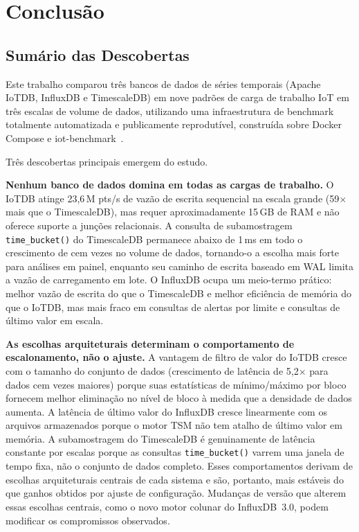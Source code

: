 \section{Conclusão}
\label{sec:conclusion}

\subsection{Sumário das Descobertas}

Este trabalho comparou três bancos de dados de séries temporais (Apache IoTDB, InfluxDB e
TimescaleDB) em nove padrões de carga de trabalho IoT em três escalas de volume de dados,
utilizando uma infraestrutura de benchmark totalmente automatizada e publicamente reprodutível,
construída sobre Docker Compose e iot-benchmark~\cite{iotbenchmark}.

Três descobertas principais emergem do estudo.

\textbf{Nenhum banco de dados domina em todas as cargas de trabalho.} O IoTDB atinge
23,6\,M pts/s de vazão de escrita sequencial na escala grande (59$\times$ mais que o
TimescaleDB), mas requer aproximadamente 15\,GB de RAM e não oferece suporte a junções
relacionais. A consulta de subamostragem \texttt{time\_bucket()} do TimescaleDB permanece
abaixo de 1\,ms em todo o crescimento de cem vezes no volume de dados, tornando-o a escolha mais
forte para análises em painel, enquanto seu caminho de escrita baseado em WAL limita a vazão
de carregamento em lote. O InfluxDB ocupa um meio-termo prático: melhor vazão de escrita do
que o TimescaleDB e melhor eficiência de memória do que o IoTDB, mas mais fraco em consultas
de alertas por limite e consultas de último valor em escala.

\textbf{As escolhas arquiteturais determinam o comportamento de escalonamento, não o ajuste.}
A vantagem de filtro de valor do IoTDB cresce com o tamanho do conjunto de dados
(crescimento de latência de 5,2$\times$ para dados cem vezes maiores) porque suas
estatísticas de mínimo/máximo por bloco fornecem melhor eliminação no nível de bloco à medida
que a densidade de dados aumenta. A latência de último valor do InfluxDB cresce linearmente
com os arquivos armazenados porque o motor TSM não tem atalho de último valor em memória.
A subamostragem do TimescaleDB é genuinamente de latência constante por escalas porque as
consultas \texttt{time\_bucket()} varrem uma janela de tempo fixa, não o conjunto de dados
completo. Esses comportamentos derivam de escolhas arquiteturais centrais de cada sistema e são,
portanto, mais estáveis do que ganhos obtidos por ajuste de configuração. Mudanças de
versão que alterem essas escolhas centrais, como o novo motor colunar do InfluxDB~3.0,
podem modificar os compromissos observados.

